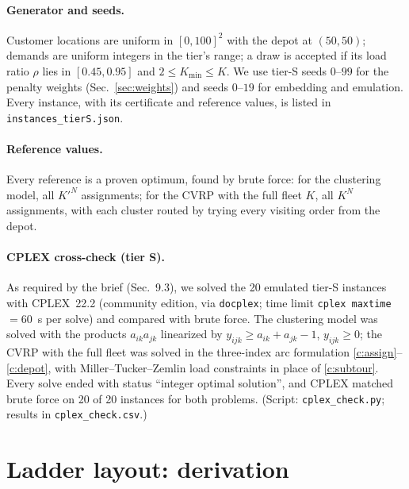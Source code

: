 \documentclass[10pt]{article}
\begin{document}
\paragraph{Generator and seeds.} Customer locations are uniform in $[0,100]^2$ with the depot at $(50,50)$; demands are
uniform integers in the tier's range; a draw is accepted if its load ratio $\rho$ lies in $[0.45,0.95]$ and
$2\le K_{\min}\le K$. We use tier-S seeds $0$--$99$ for the penalty weights (Sec.~\ref{sec:weights}) and seeds $0$--$19$
for embedding and emulation. Every instance, with its certificate and reference values, is listed in
\texttt{instances\_tierS.json}.

\paragraph{Reference values.} Every reference is a proven optimum, found by brute force: for the clustering model, all
$K'^N$ assignments; for the CVRP with the full fleet $K$, all $K^N$ assignments, with each cluster routed by trying every
visiting order from the depot.

\paragraph{CPLEX cross-check (tier S).} As required by the brief (Sec.~9.3), we solved the 20 emulated tier-S instances with CPLEX~22.2 (community edition, via \texttt{docplex}; time limit \texttt{cplex maxtime} $=60$~s
per solve) and compared with brute force. The clustering model was solved with the products $a_{ik}a_{jk}$ linearized by
$y_{ijk}\ge a_{ik}+a_{jk}-1$, $y_{ijk}\ge0$; the CVRP with the full fleet was solved in the three-index arc formulation
\eqref{c:assign}--\eqref{c:depot}, with Miller--Tucker--Zemlin load constraints in place of \eqref{c:subtour}. Every
solve ended with status ``integer optimal solution'', and CPLEX matched brute force on 20 of 20 instances for both
problems. (Script: \texttt{cplex\_check.py}; results in \texttt{cplex\_check.csv}.)


\section{Ladder layout: derivation}
\label{sec:ladder}
\end{document}
